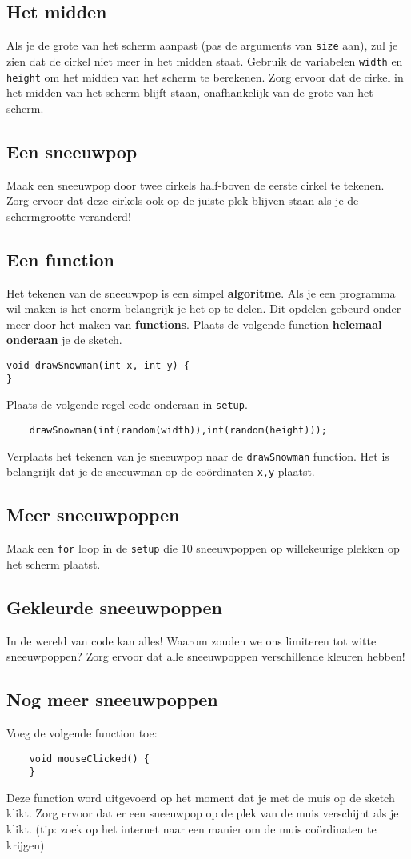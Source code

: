 \subsection{Het midden}
Als je de grote van het scherm aanpast (pas de arguments van \texttt{size} aan), zul je zien dat de cirkel niet meer in het midden staat.
Gebruik de variabelen \texttt{width} en \texttt{height} om het midden van het scherm te berekenen. Zorg ervoor dat de cirkel in het midden van het scherm blijft staan, onafhankelijk van de grote van het scherm.
\subsection{Een sneeuwpop}
Maak een sneeuwpop door twee cirkels half-boven de eerste cirkel te tekenen. Zorg ervoor dat deze cirkels ook op de juiste plek blijven staan als je de schermgrootte veranderd!
\subsection{Een function}
Het tekenen van de sneeuwpop is een simpel \textbf{algoritme}. Als je een programma wil maken is het enorm belangrijk je het op te delen. Dit opdelen gebeurd onder meer door het maken van \textbf{functions}. Plaats de volgende function \textbf{helemaal onderaan} je de sketch.
\begin{lstlisting}
void drawSnowman(int x, int y) {
}
\end{lstlisting}
Plaats de volgende regel code onderaan in \texttt{setup}.
\begin{lstlisting}
    drawSnowman(int(random(width)),int(random(height)));
\end{lstlisting}
Verplaats het tekenen van je sneeuwpop naar de \texttt{drawSnowman} function. Het is belangrijk dat je de sneeuwman op de co\"ordinaten \texttt{x,y} plaatst.

\subsection{Meer sneeuwpoppen}
Maak een \texttt{for} loop in de \texttt{setup} die 10 sneeuwpoppen op willekeurige plekken op het scherm plaatst.
\subsection{Gekleurde sneeuwpoppen}
In de wereld van code kan alles! Waarom zouden we ons limiteren tot witte sneeuwpoppen?
Zorg ervoor dat alle sneeuwpoppen verschillende kleuren hebben!
\subsection{Nog meer sneeuwpoppen}
Voeg de volgende function toe:
\begin{lstlisting}
    void mouseClicked() {
    }
\end{lstlisting}
Deze function word uitgevoerd op het moment dat je met de muis op de sketch klikt. Zorg ervoor dat er een sneeuwpop op de plek van de muis verschijnt als je klikt. (tip: zoek op het internet naar een manier om de muis co\"ordinaten te krijgen)
